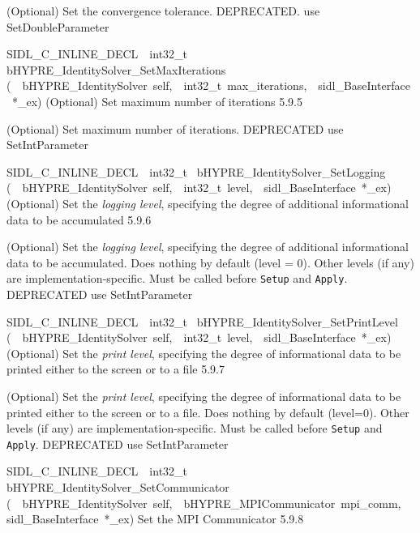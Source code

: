 \documentclass{article}
\begin{document}
\begin{cxxentry}
\begin{cxxentry}
\begin{cxxfunction}
\begin{cxxdoc}
(Optional) Set the convergence tolerance.
DEPRECATED.  use SetDoubleParameter
\end{cxxdoc}
\end{cxxfunction}
\begin{cxxfunction}
{SIDL\_C\_INLINE\_DECL\ \ int32\_t\ }
        {bHYPRE\_IdentitySolver\_SetMaxIterations}
        {(\ \ bHYPRE\_IdentitySolver\ self,\ \ int32\_t\ max\_iterations,\ \ sidl\_BaseInterface\ *\_ex)}
        {
(Optional) Set maximum number of iterations}
        {5.9.5}
\begin{cxxdoc}

(Optional) Set maximum number of iterations.
DEPRECATED   use SetIntParameter
\end{cxxdoc}
\end{cxxfunction}
\begin{cxxfunction}
{SIDL\_C\_INLINE\_DECL\ \ int32\_t\ }
        {bHYPRE\_IdentitySolver\_SetLogging}
        {(\ \ bHYPRE\_IdentitySolver\ self,\ \ int32\_t\ level,\ \ sidl\_BaseInterface\ *\_ex)}
        {
(Optional) Set the {\it logging level}, specifying the degree
of additional informational data to be accumulated}
        {5.9.6}
\begin{cxxdoc}

(Optional) Set the {\it logging level}, specifying the degree
of additional informational data to be accumulated.  Does
nothing by default (level = 0).  Other levels (if any) are
implementation-specific.  Must be called before {\tt Setup}
and {\tt Apply}.
DEPRECATED   use SetIntParameter
\end{cxxdoc}
\end{cxxfunction}
\begin{cxxfunction}
{SIDL\_C\_INLINE\_DECL\ \ int32\_t\ }
        {bHYPRE\_IdentitySolver\_SetPrintLevel}
        {(\ \ bHYPRE\_IdentitySolver\ self,\ \ int32\_t\ level,\ \ sidl\_BaseInterface\ *\_ex)}
        {
(Optional) Set the {\it print level}, specifying the degree
of informational data to be printed either to the screen or
to a file}
        {5.9.7}
\begin{cxxdoc}

(Optional) Set the {\it print level}, specifying the degree
of informational data to be printed either to the screen or
to a file.  Does nothing by default (level=0).  Other levels
(if any) are implementation-specific.  Must be called before
{\tt Setup} and {\tt Apply}.
DEPRECATED   use SetIntParameter
\end{cxxdoc}
\end{cxxfunction}
\begin{cxxfunction}
{SIDL\_C\_INLINE\_DECL\ \ int32\_t\ }
        {bHYPRE\_IdentitySolver\_SetCommunicator}
        {(\ \ bHYPRE\_IdentitySolver\ self,\ \ bHYPRE\_MPICommunicator\ mpi\_comm,\ \ sidl\_BaseInterface\ *\_ex)}
        {
Set the MPI Communicator}
        {5.9.8}
\begin{cxxdoc}


\end{cxxdoc}
\end{cxxfunction}
\end{cxxentry}
\end{cxxentry}
\end{document}
